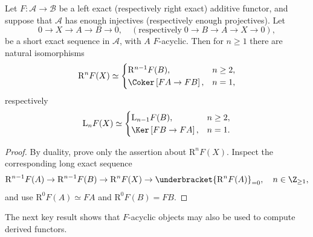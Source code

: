 \begin{proposition}\label{prop:dimension-shifting}
	Let $F:\mathcal{A}\to\mathcal{B}$ be a left exact (respectively right
	exact) additive functor, and suppose that $\mathcal{A}$ has enough
	injectives (respectively enough projectives). Let
	\[ 0 \to X \to A \to B \to 0, \quad (\text{respectively}\; 0 \to B \to A \to X \to 0 ), \]
	be a short exact sequence in $\mathcal{A}$, with $A$ $F$-acyclic. Then for
	$n\geq1$ there are natural isomorphisms
	\[\mathrm{R}^n F(X) \simeq \begin{cases}
		\mathrm{R}^{n-1} F(B), & n \geq 2, \\
		\Coker\left[FA \to FB \right], & n = 1,
	\end{cases}\]
	respectively
	\[ \mathrm{L}_n F(X) \simeq \begin{cases}
		\mathrm{L}_{n-1} F(B), & n \geq 2, \\
		\Ker\left[ FB \to FA \right], & n = 1.
	\end{cases} \]
\end{proposition}
\begin{proof}
	By duality, prove only the assertion about $\mathrm{R}^nF(X)$. Inspect the
	corresponding long exact sequence
	\[ \mathrm{R}^{n-1} F(A) \to \mathrm{R}^{n-1} F(B) \to \mathrm{R}^n F(X) \to \underbracket{\mathrm{R}^n F(A)}_{= 0}, \quad n \in \Z_{\geq 1}, \]
	and use $\mathrm{R}^0F(A)\simeq FA$ and $\mathrm{R}^0F(B)=FB$.
\end{proof}

The next key result shows that $F$-acyclic objects may also be used to compute
derived functors.

